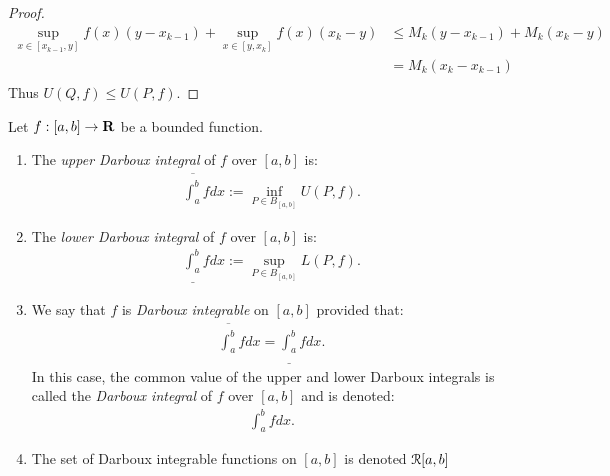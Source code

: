 \documentclass[11pt,twoside,openany]{memoir}
\begin{document}
\begin{proof}
                \begin{equation*}
                \begin{split}
                    \sup_{x \in [x_{k-1},y]} f(x)(y - x_{k-1}) + \sup_{x \in [y,x_{k}]} f(x)(x_{k} - y)
                    & \leq M_k(y-x_{k-1}) + M_k(x_k - y) \\
                    & = M_k(x_k - x_{k-1}) \\
                \end{split}
                \end{equation*}
            Thus $U(Q,f) \leq U(P,f)$.
        \end{proof}

    \begin{definition}
        Let $f:[a,b] \rightarrow \mathbf{R}$ be a bounded function.
            \begin{enumerate}[label = (\arabic*),itemsep=1pt,topsep=3pt]
                \item The \textit{upper Darboux integral} of $f$ over $[a,b]$ is:
                    \begin{equation*}
                    \begin{split}
                        \overline{\int_{a}^{b}}f dx :=\inf_{P \in B_{[a,b]}}U(P,f).
                    \end{split}
                    \end{equation*}
                \item The \textit{lower Darboux integral} of $f$ over $[a,b]$ is:
                \begin{equation*}
                \begin{split}
                    \underline{\int_{a}^{b}}f dx :=\sup_{P \in B_{[a,b]}}L(P,f).
                    \end{split}
                    \end{equation*}

                \item We say that $f$ is \textit{Darboux integrable} on $[a,b]$ provided that:
                    \begin{equation*}
                    \begin{split}
                        \overline{\int_{a}^{b}}f dx = \underline{\int_{a}^{b}}f dx .
                    \end{split}
                    \end{equation*}
                In this case, the common value of the upper and lower Darboux integrals is called the \textit{Darboux integral} of $f$ over $[a,b]$ and is denoted:
                    \begin{equation*}
                    \begin{split}
                        \int_a^b f dx.
                    \end{split}
                    \end{equation*}

                \item The set of Darboux integrable functions on $[a,b]$ is denoted $\mathcal{R}[a,b]$
            \end{enumerate}
    \end{definition}
\end{document}
